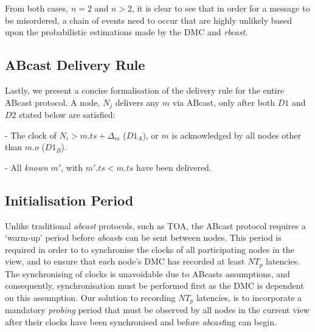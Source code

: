         From both cases, $n=2$ and $n>2$, it is clear to see that in order for a message to be misordered, a chain of events need to occur that are highly unlikely based upon the probabilistic estimations made by the DMC and \emph{rbcast}.  
        		
    \subsection{ABcast Delivery Rule}
    Lastly, we present a concise formalisation of the delivery rule for the entire \textsf{ABcast} protocol.  A node, $N_j$ delivers any $m$ via \textsf{ABcast}, only after both $D1$ and $D2$ stated below are satisfied:
	    \begin{description}[labelindent=1cm]
	        \item[$\boldsymbol{D1}$] - The clock of $N_i > m.ts + \Delta_{m}$ ($D1_A$), or $m$ is acknowledged by all nodes other than $m.o$ ($D1_B$). 
	        \item[$\boldsymbol{D2}$] - All \emph{known} $m'$, with $m'.ts < m.ts$ have been delivered.
	    \end{description}
        
        
    \subsection{Initialisation Period}
     Unlike traditional \emph{abcast} protocols, such as TOA, the \textsf{ABcast} protocol requires a \textquoteleft{}warm-up' period before \emph{abcast}s can be sent between nodes.  This period is required in order to to synchronise the clocks of all participating nodes in the view, and to ensure that each node's DMC has recorded at least $NT_p$ latencies.  The synchronising of clocks is unavoidable due to \textsf{ABcast}s assumptions, and consequently, synchronisation must be performed first as the DMC is dependent on this assumption.  Our solution to recording $NT_p$ latencies, is to incorporate a mandatory \emph{probing} period that must be observed by all nodes in the current view after their clocks have been synchronised and before \emph{abcast}ing can begin.  

